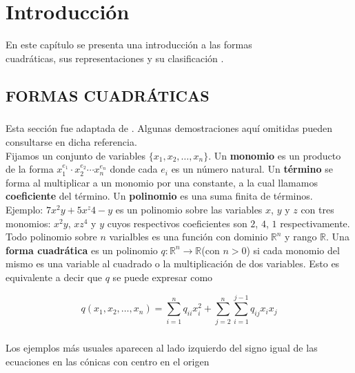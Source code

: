\chapter{Introducción}
\begin{center}
	En este capítulo se presenta una introducción a las formas\\ 		
	cuadráticas, sus representaciones y su clasificación \citep{AbarcaSoteloMarioAlberto2011Apds}.
\end{center}

\section{FORMAS CUADRÁTICAS}

\paragraph*{}
Esta sección fue adaptada de \citep{LayDavidC2001Alys}. Algunas demostraciones aquí omitidas pueden consultarse en dicha referencia.\\
Fijamos un conjunto de variables $\{x_1, x_2, \ldots, x_n\}$. Un \textbf{monomio} es un producto de la forma $x_{1}^{e_{1}} \cdot x_{2}^{e_{2}} \cdots x_{n}^{e_{n}}$ donde cada $e_{i}$ es un número natural. Un \textbf{término} se forma al multiplicar a un monomio por una constante, a la cual llamamos \textbf{coeficiente} del término. Un \textbf{polinomio} es una suma finita de términos.\\
Ejemplo: $7x^{2}y + 5x^z{4} - y$ es un polinomio sobre las variables $x$, $y$ y $z$ con tres monomios: $x^{2}y$, $xz^{4}$ y $y$ cuyos respectivos coeficientes son $2$, $4$, $1$ respectivamente.\\
Todo polinomio sobre $n$ varialbles es una función con dominio $\mathbb{R}^{n}$ y rango $\mathbb{R}$. Una \textbf{forma cuadrática} es un polinomio $q : \mathbb{R}^{n} \rightarrow \mathbb{R}$(con $n > 0$) si cada monomio del mismo es una variable al cuadrado o la multiplicación de dos variables. Esto es equivalente a decir que $q$ se puede expresar como

\begin{equation*}
q(x_{1}, x_{2}, \ldots, x_{n}) = \sum_{i=1}^{n} q_{ii}x_{i}^{2}+ \sum_{j=2}^{n}\sum_{i=1}^{j-1} q_{ij}x_{i}x_{j}
\end{equation*}

\paragraph*{}
Los ejemplos más usuales aparecen al lado izquierdo del signo igual de las ecuaciones en las cónicas con centro en el origen

